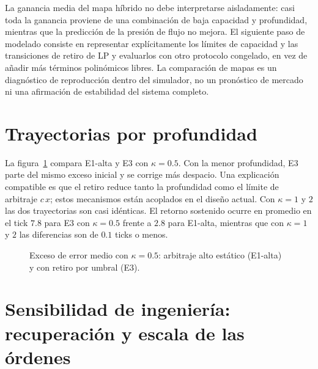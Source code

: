 La ganancia media del mapa híbrido no debe interpretarse aisladamente: casi toda la ganancia proviene de una combinación de baja capacidad y profundidad, mientras que la predicción de la presión de flujo no mejora. El siguiente paso de modelado consiste en representar explícitamente los límites de capacidad y las transiciones de retiro de LP y evaluarlos con otro protocolo congelado, en vez de añadir más términos polinómicos libres. La comparación de mapas es un diagnóstico de reproducción dentro del simulador, no un pronóstico de mercado ni una afirmación de estabilidad del sistema completo.

\section{Trayectorias por profundidad}

La figura~\ref{fig:prof} compara E1-alta y E3 con $\kappa=0.5$. Con la menor profundidad, E3 parte del mismo exceso inicial y se corrige más despacio. Una explicación compatible es que el retiro reduce tanto la profundidad como el límite de arbitraje $c\,x$; estos mecanismos están acoplados en el diseño actual. Con $\kappa=1$ y $2$ las dos trayectorias son casi idénticas. El retorno sostenido ocurre en promedio en el tick $7.8$ para E3 con $\kappa=0.5$ frente a $2.8$ para E1-alta, mientras que con $\kappa=1$ y $2$ las diferencias son de $0.1$ ticks o menos.

\begin{figure}[htbp]
\centering
{}
\caption{Exceso de error medio con $\kappa=0.5$: arbitraje alto estático (E1-alta) y con retiro por umbral (E3).}
\label{fig:prof}
\end{figure}

\section{Sensibilidad de ingeniería: recuperación y escala de las órdenes}
\label{sec:engineering-sensitivity}

